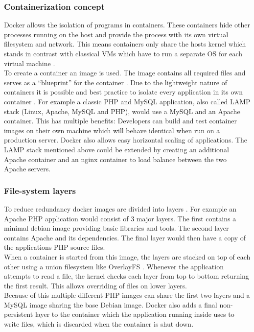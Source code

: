 \documentclass[conference,compsoc,final,a4paper]{IEEEtran}
\begin{document}
\subsubsection*{Containerization concept}
Docker allows the isolation of programs in containers. These containers hide other processes running on the host and provide the process with its own virtual filesystem and network. This means containers only share the hosts kernel which stands in contrast with classical VMs which have to run a separate OS for each virtual machine \cite{bernstein2014containers}.\\
To create a container an image is used. The image contains all required files and serves as a \enquote{blueprint} for the container \cite{bernstein2014containers}. Due to the lightweight nature of containers it is possible and best practice to isolate every application in its own container \cite{dockerBestPractices}. For example a classic PHP and MySQL application, also called LAMP stack (Linux, Apache, MySQL and PHP), would use a MySQL and an Apache container. This has multiple benefits: Developers can build and test container images on their own machine which will behave identical when run on a production server. Docker also allows easy horizontal scaling of applications. The LAMP stack mentioned above could be extended by creating an additional Apache container and an nginx container to load balance between the two Apache servers.
\subsubsection*{File-system layers}
To reduce redundancy docker images are divided into layers \cite{dockerBestPractices}. For example an Apache PHP application would consist of 3 major layers. The first contains a minimal debian image providing basic libraries and tools. The second layer contains Apache and its dependencies. The final layer would then have a copy of the applications PHP source files. \\
When a container is started from this image, the layers are stacked on top of each other using a union filesystem like OverlayFS \cite{overlayfs}. Whenever the application attempts to read a file, the kernel checks each layer from top to bottom returning the first result. This allows overriding of files on lower layers. \\
Because of this multiple different PHP images can share the first two layers and a MySQL image sharing the base Debian image. Docker also adds a final non-persistent layer to the container which the application running inside uses to write files, which is discarded when the container is shut down.
\end{document}
